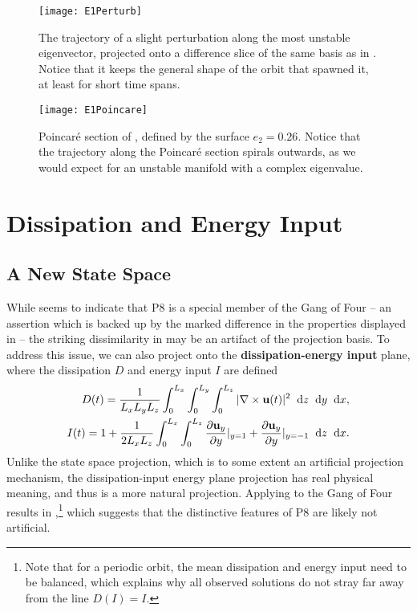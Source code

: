 \begin{figure}[h!]
\centerline{\texttt{[image: E1Perturb]}}
\caption{The trajectory of a slight perturbation along the most unstable eigenvector, projected onto a difference slice of the same basis as in . Notice that it keeps the general shape of the orbit that spawned it, at least for short time spans.}\label{fig:p8E1}
\end{figure}

\begin{figure}[h!]
\centerline{\texttt{[image: E1Poincare]}}
\caption{Poincaré section of , defined by the surface $e_2 = 0.26$. Notice that the trajectory along the Poincaré section spirals outwards, as we would expect for an unstable manifold with a complex eigenvalue.}\label{fig:E1Poincare}
\end{figure}

\section{Dissipation and Energy Input} 
  
\subsection{A New State Space}
While  seems to indicate that P8 is a special member of the Gang of Four -- an assertion which is backed up by the marked difference in the properties displayed in  -- the striking dissimilarity in  may be an artifact of the projection basis. To address this issue, we can also project onto the {\bf dissipation-energy input} plane, where the dissipation $D$ and energy input $I$ are defined
\begin{align}
D(t) = \frac{1}{L_xL_yL_z}\int{0}{L_x}{\int{0}{L_y}{\int{0}{L_z}{|\nabla\times\Vector{u}(t)|^2}{\textrm{d}z}}{\textrm{d}y}}{\textrm{d}x},\label{eq:diss}\\
I(t)  = 1 + \frac{1}{2L_xL_z}\int{0}{L_x}{\int{0}{L_z}{\pder{1}{\Vector{u}_{y}}{y} |_{y=1}+\pder{1}{\Vector{u}_{y}}{y} |_{y=-1}}{\textrm{d}z}}{\textrm{d}x}.\label{eq:einp}
\end{align} 
Unlike the state space projection, which is to some extent an artificial projection mechanism, the dissipation-input energy plane projection has real physical meaning, and thus is a more natural projection. Applying  to the Gang of Four results in ,\footnote{Note that for a periodic orbit, the mean dissipation and energy input need to be balanced, which explains why all observed solutions do not stray far away from the line $D(I) = I$.} which suggests that the distinctive features of P8 are likely not artificial.  


